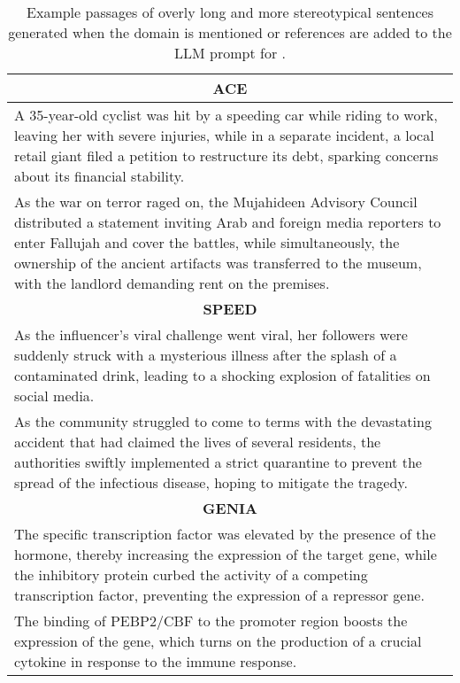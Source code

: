 \begin{table}[t]
    \centering
    \small
    \begin{tabular}{p{7cm}}
        \toprule
        \multicolumn{1}{c}{\textbf{ACE}} \\
        \midrule
        A 35-year-old cyclist was hit by a speeding car while riding to work, leaving her with severe injuries, while in a separate incident, a local retail giant filed a petition to restructure its debt, sparking concerns about its financial stability. \\
        As the war on terror raged on, the Mujahideen Advisory Council distributed a statement inviting Arab and foreign media reporters to enter Fallujah and cover the battles, while simultaneously, the ownership of the ancient artifacts was transferred to the museum, with the landlord demanding rent on the premises. \\
        \midrule
        \multicolumn{1}{c}{\textbf{SPEED}} \\
        \midrule
        As the influencer's viral challenge went viral, her followers were suddenly struck with a mysterious illness after the splash of a contaminated drink, leading to a shocking explosion of fatalities on social media. \\
        As the community struggled to come to terms with the devastating accident that had claimed the lives of several residents, the authorities swiftly implemented a strict quarantine to prevent the spread of the infectious disease, hoping to mitigate the tragedy. \\
        \midrule
        \multicolumn{1}{c}{\textbf{GENIA}} \\
        \midrule
        The specific transcription factor was elevated by the presence of the hormone, thereby increasing the expression of the target gene, while the inhibitory protein curbed the activity of a competing transcription factor, preventing the expression of a repressor gene. \\
        The binding of PEBP2/CBF to the promoter region boosts the expression of the gene, which turns on the production of a crucial cytokine in response to the immune response. \\
        \bottomrule
    \end{tabular}
    \caption{Example passages of overly long and more stereotypical sentences generated when the domain is mentioned or references are added to the LLM prompt for \starName.}
    \label{tab:star-domain-examples}
\end{table}

